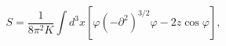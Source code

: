 \begin{equation}
\label{ASG}
S=\frac{1}{8\pi^2K}
\int d^3 x[\varphi(-\partial^2)^{3/2}\varphi
-2z\cos\varphi], 
\end{equation}

